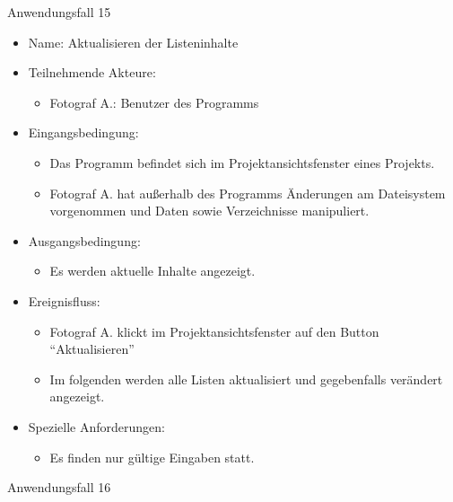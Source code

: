	\begin{description}
		\item[Anwendungsfall 15]
	\end{description}
	
	\begin{itemize}
		\item Name: Aktualisieren der Listeninhalte
		\item Teilnehmende Akteure:
		\begin{itemize}
			\item	Fotograf A.: Benutzer des Programms		
		\end{itemize}
		\item Eingangsbedingung:
		\begin{itemize}
			\item	Das Programm befindet sich im Projektansichtsfenster eines Projekts.
			\item Fotograf A. hat außerhalb des Programms Änderungen am Dateisystem vorgenommen und Daten sowie Verzeichnisse manipuliert.
		\end{itemize}
		\item Ausgangsbedingung:
		\begin{itemize}
			\item	Es werden aktuelle Inhalte angezeigt.	
		\end{itemize}
		\item Ereignisfluss:
		\begin{itemize}
			\item Fotograf A. klickt im Projektansichtsfenster auf den Button "`Aktualisieren"'
			\item Im folgenden werden alle Listen aktualisiert und gegebenfalls verändert angezeigt.
		\end{itemize}
		\item Spezielle Anforderungen:
		\begin{itemize}
			\item	Es finden nur gültige Eingaben statt.
		\end{itemize}			
	\end{itemize}
	
	\begin{description}
		\item[Anwendungsfall 16]
	\end{description}
	
